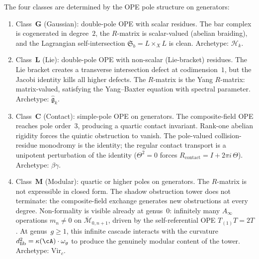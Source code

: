 \begin{remark}%
\label{rem:glcm-commentary}%
%
The four classes are determined by the OPE pole structure
on generators:
\begin{enumerate}[label=\textup{(\roman*)}]
\item Class~$\mathbf{G}$ \textup{(}Gaussian\textup{)}:
 double-pole OPE with scalar residues.
 The bar complex is cogenerated in degree~$2$,
 the $R$-matrix is scalar-valued (abelian braiding),
 and the Lagrangian self-intersection
 $\mathfrak{S}_b = L \times_X L$ is clean.
 Archetype: $\mathcal{H}_k$.

\item Class~$\mathbf{L}$ \textup{(}Lie\textup{)}:
 double-pole OPE with non-scalar
 \textup{(}Lie-bracket\textup{)} residues.
 The Lie bracket creates a transverse intersection defect
 at codimension~$1$, but the Jacobi identity kills all
 higher defects. The $R$-matrix is the Yang $R$-matrix:
 matrix-valued, satisfying the Yang--Baxter equation
 with spectral parameter.
 Archetype: $\widehat{\mathfrak{g}}_k$.

\item Class~$\mathbf{C}$ \textup{(}Contact\textup{)}:
 simple-pole OPE on generators.
 The composite-field OPE reaches pole order~$3$, producing a
 quartic contact invariant. Rank-one abelian rigidity
 forces the quintic obstruction to vanish.
 The pole-valued collision-residue monodromy is the identity; the
 regular contact transport is a unipotent perturbation of the identity
 ($\Theta^2 = 0$ forces $R_{\mathrm{contact}} = I + 2\pi i\,\Theta$).
 Archetype: $\beta\gamma$.

\item Class~$\mathbf{M}$ \textup{(}Modular\textup{)}:
 quartic or higher poles on generators.
 The $R$-matrix is not expressible in closed form.
 The shadow obstruction tower does not terminate: the composite-field
 exchange generates new obstructions at every degree.
 Non-formality is visible already at genus~$0$: infinitely
 many $A_\infty$ operations $m_n \neq 0$ on
 $\overline{\mathcal{M}}_{0,n+1}$, driven by the
 self-referential OPE $T_{(1)}T = 2T$. At genus~$g \geq 1$,
 this infinite cascade interacts with the curvature
 $d_{\mathrm{fib}}^2 = \kappa(\cA) \cdot \omega_g$ to produce
 the genuinely modular content of the tower.
 Archetype: $\mathrm{Vir}_c$.
\end{enumerate}
\end{remark}

